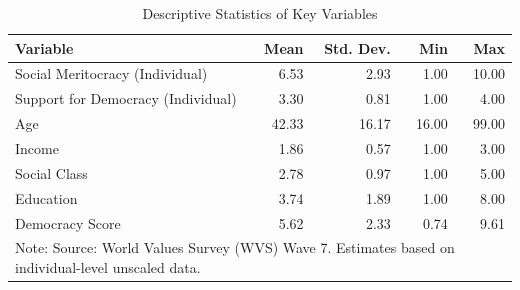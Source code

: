 \begin{table}[!h]
\centering
\caption{Descriptive Statistics of Key Variables}
\centering
\begin{tabular}[t]{lrrrr}
\toprule
Variable & Mean & Std. Dev. & Min & Max\\
\midrule
Social Meritocracy (Individual) & 6.53 & 2.93 & 1.00 & 10.00\\
Support for Democracy (Individual) & 3.30 & 0.81 & 1.00 & 4.00\\
Age & 42.33 & 16.17 & 16.00 & 99.00\\
Income & 1.86 & 0.57 & 1.00 & 3.00\\
Social Class & 2.78 & 0.97 & 1.00 & 5.00\\
Education & 3.74 & 1.89 & 1.00 & 8.00\\
Democracy Score & 5.62 & 2.33 & 0.74 & 9.61\\
\bottomrule
\multicolumn{5}{l}{\rule{0pt}{1em}Note: Source: World Values Survey (WVS) Wave 7. Estimates based on individual-level unscaled data.}\\
\end{tabular}
\end{table}
